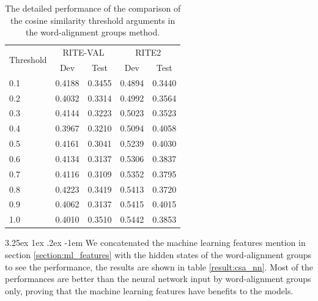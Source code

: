 \documentclass[12pt]{article}
\makeatletter
\renewcommand\paragraph{\@startsection{paragraph}{5}{\z@}%
  {3.25ex \@plus1ex \@minus.2ex}%
  {-1em}%
  {\normalfont\normalsize\bfseries}}
\makeatother
\begin{document}
\begin{CJK*}{UTF8}{bkai}
\begin{spacing}{1.77}
\begin{table}[H]
  \centering
  \setlength{\extrarowheight}{-3pt}
  \caption{The detailed performance of the comparison of the cosine similarity threshold arguments in the word-alignment groups method.}
  \label{result:threshold_comparison}
  \begin{tabular}{|l|l|l|l|l|}
  \hline
  \multirow{2}{*}{Threshold} & \multicolumn{2}{c|}{RITE-VAL} & \multicolumn{2}{c|}{RITE2} \\ \cline{2-5}
   & \multicolumn{1}{c|}{Dev} & \multicolumn{1}{c|}{Test} & \multicolumn{1}{c|}{Dev} & \multicolumn{1}{c|}{Test} \\ \hline
  0.1 & 0.4188 & 0.3455 & 0.4894 & 0.3440 \\ \hline
  0.2 & 0.4032 & 0.3314 & 0.4992 & 0.3564 \\ \hline
  0.3 & 0.4144 & 0.3223 & 0.5023 & 0.3523 \\ \hline
  0.4 & 0.3967 & 0.3210 & 0.5094 & 0.4058 \\ \hline
  0.5 & 0.4161 & 0.3041 & 0.5239 & 0.4030 \\ \hline
  0.6 & 0.4134 & 0.3137 & 0.5306 & 0.3837 \\ \hline
  0.7 & 0.4116 & 0.3109 & 0.5352 & 0.3795 \\ \hline
  0.8 & 0.4223 & 0.3419 & 0.5413 & 0.3720 \\ \hline
  0.9 & 0.4062 & 0.3137 & 0.5415 & 0.4015 \\ \hline
  1.0 & 0.4010 & 0.3510 & 0.5442 & 0.3853 \\ \hline
  \end{tabular}
\end{table}

\paragraph{}
We concatenated the machine learning features mention in section \ref{section:ml_features} with the hidden states of the word-alignment groups to see the performance, the results are shown in table \ref{result:csa_nn}. Most of the performances are better than the neural network input by word-alignment groups only, proving that the machine learning features have benefits to the models.


\end{spacing}
\end{CJK*}
\end{document}
